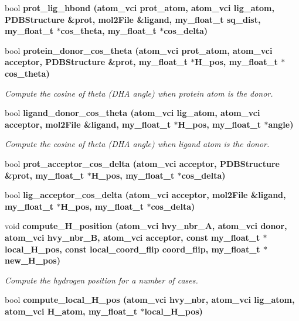 \begin{CompactItemize}
\item 
bool \bf{prot\_\-lig\_\-hbond} (atom\_\-vci prot\_\-atom, atom\_\-vci lig\_\-atom, \bf{PDBStructure} \&prot, \bf{mol2File} \&ligand, my\_\-float\_\-t sq\_\-dist, my\_\-float\_\-t $\ast$cos\_\-theta, my\_\-float\_\-t $\ast$cos\_\-delta)
\item 
bool \bf{protein\_\-donor\_\-cos\_\-theta} (atom\_\-vci prot\_\-atom, atom\_\-vci acceptor, \bf{PDBStructure} \&prot, my\_\-float\_\-t $\ast$H\_\-pos, my\_\-float\_\-t $\ast$cos\_\-theta)
\begin{CompactList}\small\item\em Compute the cosine of theta (DHA angle) when protein atom is the donor. \item\end{CompactList}\item 
bool \bf{ligand\_\-donor\_\-cos\_\-theta} (atom\_\-vci lig\_\-atom, atom\_\-vci acceptor, \bf{mol2File} \&ligand, my\_\-float\_\-t $\ast$H\_\-pos, my\_\-float\_\-t $\ast$angle)
\begin{CompactList}\small\item\em Compute the cosine of theta (DHA angle) when ligand atom is the donor. \item\end{CompactList}\item 
bool \bf{prot\_\-acceptor\_\-cos\_\-delta} (atom\_\-vci acceptor, \bf{PDBStructure} \&prot, my\_\-float\_\-t $\ast$H\_\-pos, my\_\-float\_\-t $\ast$cos\_\-delta)
\item 
bool \bf{lig\_\-acceptor\_\-cos\_\-delta} (atom\_\-vci acceptor, \bf{mol2File} \&ligand, my\_\-float\_\-t $\ast$H\_\-pos, my\_\-float\_\-t $\ast$cos\_\-delta)
\item 
void \bf{compute\_\-H\_\-position} (atom\_\-vci hvy\_\-nbr\_\-A, atom\_\-vci donor, atom\_\-vci hvy\_\-nbr\_\-B, atom\_\-vci acceptor, const my\_\-float\_\-t $\ast$local\_\-H\_\-pos, const \bf{local\_\-coord\_\-flip} coord\_\-flip, my\_\-float\_\-t $\ast$new\_\-H\_\-pos)\label{classASCbase_1_1HbondGeometry_b458eb015b0f1b1febf0ba0e69eec510}

\begin{CompactList}\small\item\em Compute the hydrogen position for a number of cases. \item\end{CompactList}\item 
bool \bf{compute\_\-local\_\-H\_\-pos} (atom\_\-vci hvy\_\-nbr, atom\_\-vci lig\_\-atom, atom\_\-vci H\_\-atom, my\_\-float\_\-t $\ast$local\_\-H\_\-pos)\label{classASCbase_1_1HbondGeometry_9f6be856e4b9a1ca557a27493453626a}


\end{CompactItemize}
